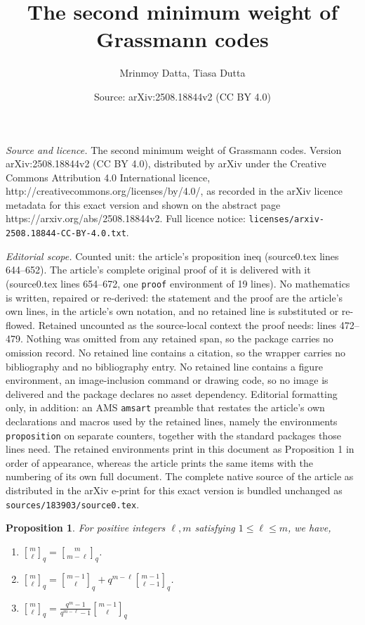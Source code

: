 \documentclass[10pt,a4paper]{amsart}
\title{The second minimum weight of Grassmann codes}
\author{Mrinmoy Datta, Tiasa Dutta}
\date{Source: arXiv:2508.18844v2 (CC BY 4.0)}
\newtheorem{proposition}{Proposition}
\begin{document}
\maketitle

\noindent\emph{Source and licence.} The second minimum weight of Grassmann codes. Version arXiv:2508.18844v2 (CC BY 4.0), distributed by arXiv under the Creative Commons Attribution 4.0 International licence, http://creativecommons.org/licenses/by/4.0/, as recorded in the arXiv licence metadata for this exact version and shown on the abstract page https://arxiv.org/abs/2508.18844v2. Full licence notice: \texttt{licenses/arxiv-2508.18844-CC-BY-4.0.txt}.\par\smallskip

\noindent\textit{Editorial scope.} Counted unit: the article's proposition ineq (source0.tex lines 644--652). The article's complete original proof of it is delivered with it (source0.tex lines 654--672, one \texttt{proof} environment of 19 lines). No mathematics is written, repaired or re-derived: the statement and the proof are the article's own lines, in the article's own notation, and no retained line is substituted or re-flowed.  Retained uncounted as the source-local context the proof needs: lines 472--479.  Nothing was omitted from any retained span, so the package carries no omission record.  No retained line contains a citation, so the wrapper carries no bibliography and no bibliography entry.  No retained line contains a figure environment, an image-inclusion command or drawing code, so no image is delivered and the package declares no asset dependency.  Editorial formatting only, in addition: an AMS \texttt{amsart} preamble that restates the article's own declarations and macros used by the retained lines, namely the environments \texttt{proposition} on separate counters, together with the standard packages those lines need.  The retained environments print in this document as Proposition 1 in order of appearance, whereas the article prints the same items with the numbering of its own full document.  The complete native source of the article as distributed in the arXiv e-print for this exact version is bundled unchanged as \texttt{sources/183903/source0.tex}.
\begin{proposition}\label{identities}
    For positive integers $\ell, m$ satisfying $1 \le \ell \le m$, we have,
    \begin{enumerate}
        \item[(a)] ${m \brack \ell}_q = {m \brack m - \ell}_q$. 
        \item[(b)] ${m \brack \ell}_q = {m - 1 \brack \ell}_q + q^{m- \ell}{m - 1 \brack \ell - 1}_q$.
        \item[(c)] ${m \brack \ell}_q = \frac{q^m - 1}{q^{m - \ell} - 1} {m - 1 \brack \ell}_q$
    \end{enumerate}
\end{proposition}
\end{document}
